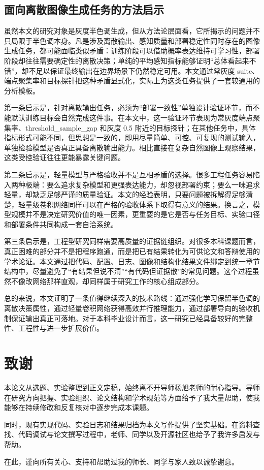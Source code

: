 \documentclass[thesis]{../zstucs-graduation-project}
\begin{document}
\subsection{面向离散图像生成任务的方法启示}
虽然本文的研究对象是灰度半色调生成，但从方法论层面看，它所揭示的问题并不只局限于半色调本身。凡是涉及离散输出、感知质量和部署稳定性同时存在的图像生成任务，都可能面临类似矛盾：训练阶段可以借助概率表达维持可学习性，部署阶段却往往需要确定性的离散决策；单纯的平均感知指标能够证明“总体看起来不错”，却不足以保证最终输出在边界场景下仍然稳定可用。本文通过常灰度 suite、端点聚集率和目标探针把这种矛盾显式化，实际上为这类任务提供了一套较通用的分析模板。

第一条启示是，针对离散输出任务，必须为“部署一致性”单独设计验证环节，而不能默认训练目标会自然完成这件事。在本文中，这一验证环节表现为常灰度端点聚集率、threshold\_sample\_gap 和灰度 0.5 附近的目标探针；在其他任务中，具体指标形式可能不同，但思想是一致的，即用尽量简单、可控、可复现的测试输入，单独检验模型是否真正具备离散输出能力。相比直接在复杂自然图像上观察结果，这类受控验证往往更能暴露关键问题。

第二条启示是，轻量模型与严格验收并不是互相矛盾的选择。很多工程任务容易陷入两种极端：要么追求复杂模型和更强表达能力，却忽视部署约束；要么一味追求轻量，却缺乏足够严谨的质量验证。本文的经验表明，只要问题被拆解得足够清楚，轻量级卷积网络同样可以在严格的验收体系下取得有意义的结果。换言之，模型规模并不是决定研究价值的唯一因素，更重要的是它是否与任务目标、实验口径和部署条件共同构成一套自洽系统。

第三条启示是，工程型研究同样需要高质量的证据链组织。对很多本科课题而言，真正困难的部分并不是把程序跑通，而是把已有结果转化为可供论文和答辩使用的学术论证。本文通过把代码、配置、日志、图像和结构化结果文件绑定到统一章节结构中，尽量避免了“有结果但说不清”“有代码但证据散”的常见问题。这个过程虽然不像改网络那样直观，却同样属于研究工作的核心组成部分。

总的来说，本文证明了一条值得继续深入的技术路线：通过强化学习保留半色调的离散决策属性，通过轻量卷积网络获得高效并行推理能力，通过部署导向的验收机制保证输出真正可落地。对于本科毕业设计而言，这一研究已经具备较好的完整性、工程性与进一步扩展价值。

\clearpage
\printbibliography[heading=bibintoc]

\clearpage
\section*{致谢}
本论文从选题、实验整理到正文定稿，始终离不开导师杨旭老师的耐心指导。导师在研究方向把握、实验组织、论文结构和学术规范等方面给予了我大量帮助，使我能够在持续修改和反复核对中逐步完成本课题。

同时，现有实现代码、实验日志和结果归档为本文写作提供了坚实基础。在资料查找、代码调试与论文撰写过程中，老师、同学以及开源社区也给予了我许多启发与帮助。

在此，谨向所有关心、支持和帮助过我的师长、同学与家人致以诚挚谢意。
\end{document}
